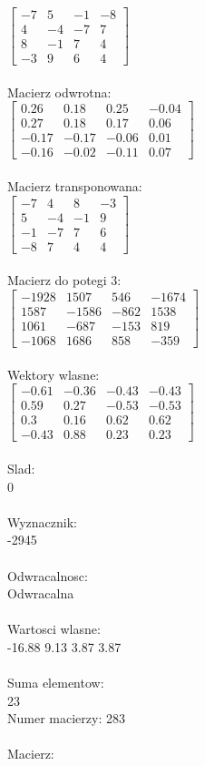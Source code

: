 \documentclass[a4paper,12pt]{article}
\begin{document}
$\begin{bmatrix} -7&5&-1&-8\\4&-4&-7&7\\8&-1&7&4\\-3&9&6&4 \end{bmatrix}$
\\
\\
Macierz odwrotna:\\

$\begin{bmatrix} 0.26&0.18&0.25&-0.04\\0.27&0.18&0.17&0.06\\-0.17&-0.17&-0.06&0.01\\-0.16&-0.02&-0.11&0.07 \end{bmatrix}$
\\
\\
Macierz transponowana:\\

$\begin{bmatrix} -7&4&8&-3\\5&-4&-1&9\\-1&-7&7&6\\-8&7&4&4 \end{bmatrix}$
\\
\\
Macierz do potegi 3:\\

$\begin{bmatrix} -1928&1507&546&-1674\\1587&-1586&-862&1538\\1061&-687&-153&819\\-1068&1686&858&-359 \end{bmatrix}$
\\
\\
Wektory wlasne:\\

$\begin{bmatrix} -0.61&-0.36&-0.43&-0.43\\0.59&0.27&-0.53&-0.53\\0.3&0.16&0.62&0.62\\-0.43&0.88&0.23&0.23 \end{bmatrix}$
\\
\\
Slad:\\
0
\\
\\
Wyznacznik:\\
-2945
\\
\\
Odwracalnosc:\\
Odwracalna
\\
\\
Wartosci wlasne:\\
-16.88 9.13 3.87 3.87
\\
\\
Suma elementow:\\
23
\\
\newpage
Numer macierzy:
283
\\
\\
Macierz:\\
\end{document}
